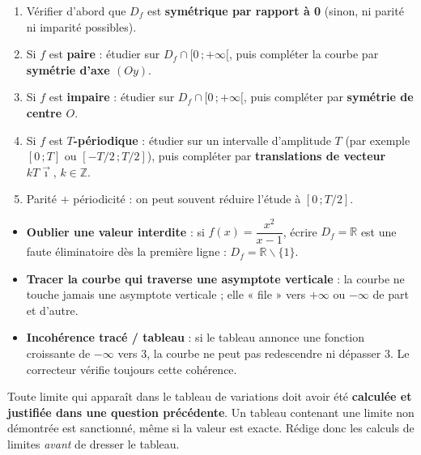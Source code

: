 \documentclass[11pt]{article}
\def\setminus{\mathbin{\backslash}}\let\smallsetminus\setminus
\begin{document}
\begin{methode}
\begin{enumerate}
\item Vérifier d'abord que $D_f$ est \textbf{symétrique par rapport à 0} (sinon, ni parité ni imparité possibles).
\item Si $f$ est \textbf{paire} : étudier sur $D_f \cap [0\,; +\infty[$, puis compléter la courbe par \textbf{symétrie d'axe $(Oy)$}.
\item Si $f$ est \textbf{impaire} : étudier sur $D_f \cap [0\,; +\infty[$, puis compléter par \textbf{symétrie de centre $O$}.
\item Si $f$ est \textbf{$T$-périodique} : étudier sur un intervalle d'amplitude $T$ (par exemple $[0\,;T]$ ou $[-T/2\,;T/2]$), puis compléter par \textbf{translations de vecteur $kT\vec{\imath}$}, $k \in \mathbb{Z}$.
\item Parité $+$ périodicité : on peut souvent réduire l'étude à $[0\,; T/2]$.
\end{enumerate}
\end{methode}

\begin{attention}
\begin{itemize}
\item \textbf{Oublier une valeur interdite} : si $f(x) = \dfrac{x^2}{x-1}$, écrire $D_f = \mathbb{R}$ est une faute éliminatoire dès la première ligne : $D_f = \mathbb{R} \setminus \{1\}$.
\item \textbf{Tracer la courbe qui traverse une asymptote verticale} : la courbe ne touche jamais une asymptote verticale ; elle « file » vers $+\infty$ ou $-\infty$ de part et d'autre.
\item \textbf{Incohérence tracé / tableau} : si le tableau annonce une fonction croissante de $-\infty$ vers $3$, la courbe ne peut pas redescendre ni dépasser $3$. Le correcteur vérifie toujours cette cohérence.
\end{itemize}
\end{attention}

\begin{attention}
Toute limite qui apparaît dans le tableau de variations doit avoir été \textbf{calculée et justifiée dans une question précédente}. Un tableau contenant une limite non démontrée est sanctionné, même si la valeur est exacte. Rédige donc les calculs de limites \emph{avant} de dresser le tableau.
\end{attention}
\end{document}
